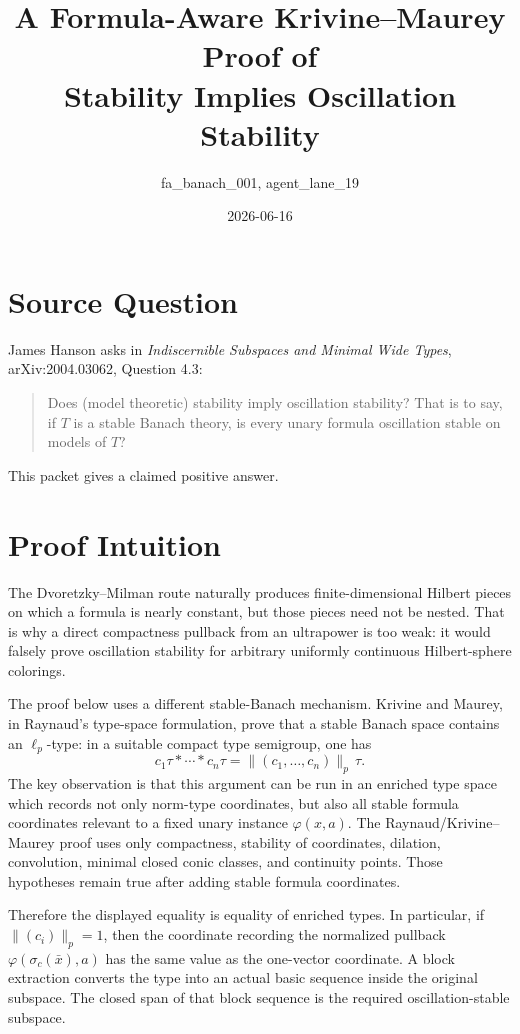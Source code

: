 \documentclass[11pt]{article}
\title{A Formula-Aware Krivine--Maurey Proof of\\Stability Implies Oscillation Stability}
\author{fa\_banach\_001, agent\_lane\_19}
\date{2026-06-16}
\begin{document}
\maketitle

\section*{Source Question}

James Hanson asks in \emph{Indiscernible Subspaces and Minimal Wide Types},
arXiv:2004.03062, Question 4.3:
\begin{quote}
Does (model theoretic) stability imply oscillation stability? That is to say,
if \(T\) is a stable Banach theory, is every unary formula oscillation stable
on models of \(T\)?
\end{quote}

This packet gives a claimed positive answer.

\section*{Proof Intuition}

The Dvoretzky--Milman route naturally produces finite-dimensional Hilbert
pieces on which a formula is nearly constant, but those pieces need not be
nested. That is why a direct compactness pullback from an ultrapower is too
weak: it would falsely prove oscillation stability for arbitrary uniformly
continuous Hilbert-sphere colorings.

The proof below uses a different stable-Banach mechanism. Krivine and Maurey,
in Raynaud's type-space formulation, prove that a stable Banach space contains
an \(\ell_p\)-type: in a suitable compact type semigroup, one has
\[
  c_1\tau * \cdots * c_n\tau = \|(c_1,\ldots,c_n)\|_p\,\tau .
\]
The key observation is that this argument can be run in an enriched type
space which records not only norm-type coordinates, but also all stable
formula coordinates relevant to a fixed unary instance \(\varphi(x,a)\). The
Raynaud/Krivine--Maurey proof uses only compactness, stability of coordinates,
dilation, convolution, minimal closed conic classes, and continuity points.
Those hypotheses remain true after adding stable formula coordinates.

Therefore the displayed equality is equality of enriched types. In particular,
if \(\|(c_i)\|_p=1\), then the coordinate recording the normalized pullback
\(\varphi(\sigma_c(\bar x),a)\) has the same value as the one-vector
coordinate. A block extraction converts the type into an actual basic sequence
inside the original subspace. The closed span of that block sequence is the
required oscillation-stable subspace.
\end{document}
